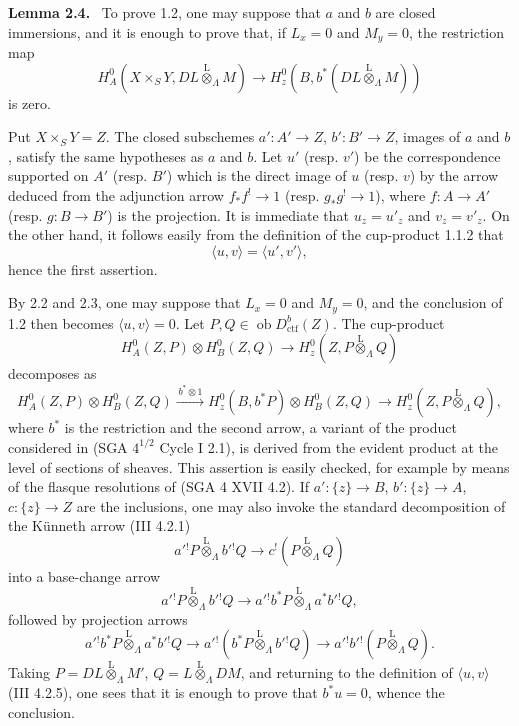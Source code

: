 \documentclass[11pt]{article}
\newenvironment{statement}[1]{\par\medskip\noindent\textbf{#1.}\ }{\par\medskip}
\providecommand{\lten}{\overset{\mathrm L}{\otimes}}
\providecommand{\Ob}{\operatorname{ob}}
\providecommand{\lten}{\overset{\mathrm L}{\otimes}}
\providecommand{\lten}{\overset{\mathrm L}{\otimes}}
\providecommand{\Ob}{\operatorname{ob}}
\providecommand{\lten}{\overset{\mathrm L}{\otimes}}
\providecommand{\lten}{\overset{\mathrm L}{\otimes}}
\providecommand{\Ob}{\operatorname{Ob}}
\providecommand{\lten}{\overset{\mathrm L}{\otimes}}
\begin{document}
\begin{statement}{Lemma 2.4}
To prove 1.2, one may suppose that $a$ and $b$ are closed immersions, and it is enough to prove that, if $L_x=0$ and $M_y=0$, the restriction map
\begin{equation}
H_A^0(X\times_SY,DL\lten_{\Lambda}M)
 \longrightarrow H_z^0(B,b^*(DL\lten_{\Lambda}M))
\tag{2.4.1}
\end{equation}
is zero.
\end{statement}

Put $X\times_SY=Z$. The closed subschemes $a':A'\to Z$, $b':B'\to Z$, images of $a$ and $b$, satisfy the same hypotheses as $a$ and $b$. Let $u'$ (resp. $v'$) be the correspondence supported on $A'$ (resp. $B'$) which is the direct image of $u$ (resp. $v$) by the arrow deduced from the adjunction arrow $f_*f^!\to1$ (resp. $g_*g^!\to1$), where $f:A\to A'$ (resp. $g:B\to B'$) is the projection. It is immediate that $u_z=u'_z$ and $v_z=v'_z$. On the other hand, it follows easily from the definition of the cup-product 1.1.2 that
\[
\langle u,v\rangle=\langle u',v'\rangle,
\]
hence the first assertion.

By 2.2 and 2.3, one may suppose that $L_x=0$ and $M_y=0$, and the conclusion of 1.2 then becomes $\langle u,v\rangle=0$. Let $P,Q\in\Ob D_{\mathrm{ctf}}^b(Z)$. The cup-product
\[
H_A^0(Z,P)\otimes H_B^0(Z,Q)\longrightarrow H_z^0(Z,P\lten_{\Lambda}Q)
\]
decomposes as
\[
H_A^0(Z,P)\otimes H_B^0(Z,Q)
 \xrightarrow{\,b^*\otimes 1\,}
H_z^0(B,b^*P)\otimes H_B^0(Z,Q)
 \longrightarrow H_z^0(Z,P\lten_{\Lambda}Q),
\]
where $b^*$ is the restriction and the second arrow, a variant of the product considered in (SGA $4^{1/2}$ Cycle I 2.1), is derived from the evident product at the level of sections of sheaves. This assertion is easily checked, for example by means of the flasque resolutions of (SGA 4 XVII 4.2). If $a':\{z\}\to B$, $b':\{z\}\to A$, $c:\{z\}\to Z$ are the inclusions, one may also invoke the standard decomposition of the Künneth arrow (III 4.2.1)
\[
a'{}^!P\lten_{\Lambda} b'{}^!Q\longrightarrow c^!(P\lten_{\Lambda}Q)
\]
into a base-change arrow
\[
a'{}^!P\lten_{\Lambda} b'{}^!Q\longrightarrow a'{}^!b^*P\lten_{\Lambda} a^*b'{}^!Q,
\]
followed by projection arrows
\[
a'{}^!b^*P\lten_{\Lambda} a^*b'{}^!Q
 \longrightarrow a'{}^!(b^*P\lten_{\Lambda} b'{}^!Q)
 \longrightarrow a'{}^!b'{}^!(P\lten_{\Lambda}Q).
\]
Taking $P=DL\lten_{\Lambda}M'$, $Q=L\lten_{\Lambda}DM$, and returning to the definition of $\langle u,v\rangle$ (III 4.2.5), one sees that it is enough to prove that $b^*u=0$, whence the conclusion.
\end{document}
